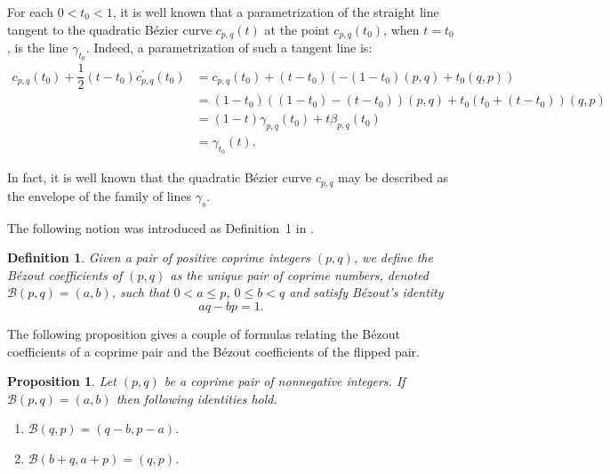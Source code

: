 \documentclass[12pt,english]{article}
\newcommand{\B}{\mathcal B}
\newtheorem{proposition}[theorem]{Proposition}
\newtheorem{definition}[theorem]{Definition}
\begin{document}
For each $0< t_0< 1$, it is well known that a parametrization of the straight line tangent to the quadratic B\'ezier curve  $c_{p,q}(t)$ at the point $c_{p,q}(t_0)$, when $t=t_0$, is the line $\gamma_{t_0}$. Indeed, a parametrization of  such a tangent line is:
\begin{align*}
    c_{p,q}(t_0)+\dfrac{1}{2}(t-t_0)c^{\prime}_{p,q}(t_0)&= 
    c_{p,q}(t_0)+(t-t_0)\left(-(1-t_0)(p,q)+t_0(q,p)\right)\\
    &=(1-t_0)\left((1-t_0)-(t-t_0)\right)(p,q)+t_0\left(t_0+(t-t_0)\right)(q,p)\\
    &=(1-t)\gamma_{p,q}(t_0)+t\beta_{p,q}(t_0)\\
    &=\gamma_{t_0}(t).
\end{align*}

In fact, it is well known that the quadratic B\'ezier curve $c_{p,q}$ may be described as the envelope of the family of lines $\gamma_s$.



The following notion was introduced  as  Definition~1
in \cite{ILM}.
\begin{definition}\label{defbezout}
Given a pair of positive coprime integers $(p,q)$, we define the {\em B\'ezout coefficients} of $(p,q)$ 
as the unique pair of coprime numbers, denoted $\mathcal B(p,q)=(a,b)$, such that $0<a \leq p$, $0\leq b < q$  and  satisfy  {B\'ezout's identity}
\begin{equation*}
    aq-bp=1.
\end{equation*}

 \end{definition}



The following proposition gives a couple of formulas relating the B\'ezout coefficients of a coprime pair and the B\'ezout coefficients of the flipped pair. 

\begin{proposition}\label{prop}
Let $(p,q)$ be a coprime pair of nonnegative integers. If $\B(p,q)=(a,b)$ then following identities hold.
    \begin{enumerate} 
    \item  $\B(q,p)=(q-b,p-a)$.
    \item  $\B(b+q,a+p)=(q,p)$.
    \end{enumerate}
\end{proposition}
\end{document}
